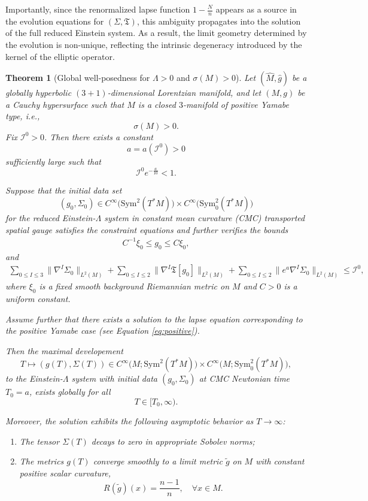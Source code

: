 \documentclass{amsart}
\newtheorem{theorem}{Theorem}[section]
\begin{document}
\noindent Importantly, since the renormalized lapse function $1 - \frac{N}{n}$ appears as a source in the evolution equations for $(\Sigma, \mathfrak{T})$, this ambiguity propagates into the solution of the full reduced Einstein system. As a result, the limit geometry determined by the evolution is non-unique, reflecting the intrinsic degeneracy introduced by the kernel of the elliptic operator.


\begin{theorem}[Global well-posedness for $\Lambda > 0$ and $\sigma(M)>0$]
\label{main2}
Let $(\widehat{M}, \widehat{g})$ be a globally hyperbolic $(3+1)$-dimensional Lorentzian manifold, and let $(M,g)$ be a Cauchy hypersurface such that $M$ is a closed $3$-manifold of positive Yamabe type, i.e., 
\[
\sigma(M) > 0.
\] 
Fix $\mathcal{I}^0 > 0$. Then there exists a constant 
\[
a = a(\mathcal{I}^0) > 0
\]
sufficiently large such that 
\[
\mathcal{I}^0 e^{-\frac{a}{10}} < 1.
\]

\noindent Suppose that the initial data set 
\[
(g_0, \Sigma_0) \in C^\infty\big(\mathrm{Sym}^2(T^*M)\big) \times C^\infty\big(\mathrm{Sym}^2_0(T^*M)\big)
\]
for the reduced Einstein-$\Lambda$ system in constant mean curvature (CMC) transported spatial gauge satisfies the constraint equations and further verifies the bounds 
\begin{align}
\label{eq:metric_control}
C^{-1} \xi_0 \leq g_0 \leq C \xi_0,
\end{align}
and
\begin{align}
\label{eq:data_estimate}
\sum_{0 \leq I \leq 3} \|\nabla^I \Sigma_0\|_{L^2(M)} + \sum_{0 \leq I \leq 2} \|\nabla^I \mathfrak{T}[g_0]\|_{L^2(M)} + \sum_{0 \leq I \leq 2} \| e^{a} \nabla^I \Sigma_0 \|_{L^2(M)} \leq \mathcal{I}^0,
\end{align}
where $\xi_0$ is a fixed smooth background Riemannian metric on $M$ and $C > 0$ is a uniform constant.

\noindent Assume further that there exists a solution to the lapse equation corresponding to the positive Yamabe case (see Equation \eqref{eq:positive}).

\noindent Then the maximal developement 
\[
T \mapsto (g(T), \Sigma(T)) \in C^\infty\big(M; \mathrm{Sym}^2(T^*M)\big) \times C^\infty\big(M; \mathrm{Sym}^2_0(T^*M)\big),
\]
to the Einstein-$\Lambda$ system with initial data $(g_0, \Sigma_0)$ at CMC Newtonian time $T_0 = a$, exists globally for all
\[
T \in [T_0, \infty).
\]

\noindent Moreover, the solution exhibits the following asymptotic behavior as $T \to \infty$:
\begin{enumerate}[label=(\roman*)]
    \item The tensor $\Sigma(T)$ decays to zero in appropriate Sobolev norms;
    \item The metrics $g(T)$ converge smoothly to a limit metric $\widetilde{g}$ on $M$ with constant positive scalar curvature,
    \[
    R(\widetilde{g})(x) = \frac{n-1}{n}, \quad \forall x \in M.
    \]
\end{enumerate}


\end{theorem}
\end{document}
